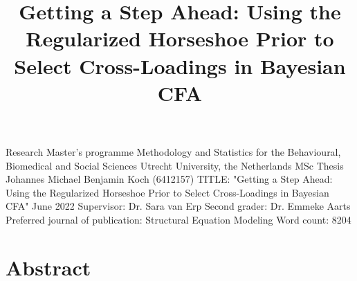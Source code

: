 \documentclass[
  man, donotrepeattitle,floatsintext]{apa6}
\title{Getting a Step Ahead: Using the Regularized Horseshoe Prior to Select Cross-Loadings in Bayesian CFA}
\author{\phantom{0}}
\date{}
\affiliation{\phantom{0}}
\begin{document}
\maketitle

\thispagestyle{empty}

\begin{large}
\noindent Research Master's programme 
Methodology and Statistics for the Behavioural, Biomedical and Social Sciences \newline
Utrecht University, the Netherlands \newline
\newline
\newline
\newline
\newline
MSc Thesis Johannes Michael Benjamin Koch (6412157) 
\newline
TITLE: "Getting a Step Ahead: Using the Regularized Horseshoe Prior to Select Cross-Loadings in Bayesian CFA"
\newline
June 2022 
\newline
\newline
\newline
\newline
\newline
Supervisor:\newline
Dr. Sara van Erp \newline
\newline
\newline
Second grader: \newline
Dr. Emmeke Aarts
\newline
\newline
\newline
\newline
Preferred journal of publication: Structural Equation Modeling
\newline
Word count: 8204
\newline
\end{large}
\addtocounter{page}{-1}
\clearpage
\pagebreak

\setcounter{page}{0}
\thispagestyle{empty}
\pagestyle{plain}

\clearpage

\hypertarget{abstract}{%
\section{Abstract}\label{abstract}}
\end{document}

